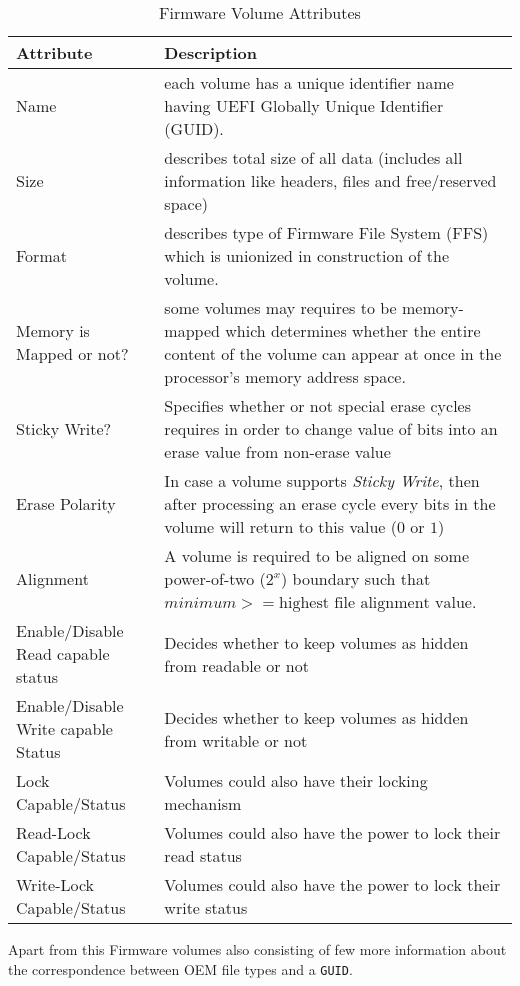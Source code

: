 \begin{table}[!htbp]
	\centering
	\renewcommand{\arraystretch}{2}
	\caption{Firmware Volume Attributes}\label{table:firmware-volume-attributes}
	\begin{tabular}{p{4cm} | p{11cm}}
		\textbf{Attribute} & \textbf{Description}
		\\ \hline \hline
		Name & each volume has a unique identifier name having UEFI Globally Unique Identifier (GUID). 
		\\ \hline
		Size & describes total size of all data (includes all information like headers, files and free/reserved space)
		\\ \hline
		Format & describes type of Firmware File System (FFS) which is unionized in construction of the volume.
		\\ \hline
		Memory is Mapped or not? & some volumes may requires to be memory-mapped which determines whether the entire content of the volume can appear at once in the processor's memory address space. 
		\\ \hline
		Sticky Write? & Specifies whether or not special erase cycles requires in order to change value of bits into an erase value from non-erase value
		\\ \hline
		Erase Polarity & In case a volume supports \textit{Sticky Write}, then after processing an erase cycle every bits in the volume will return to this value ($ 0 $ or $ 1 $)
		\\ \hline
		Alignment & A volume is required to be aligned on some power-of-two ($ 2^x $) boundary such that $ minimum >= \text{highest file alignment value} $.
		\\ \hline
		Enable/Disable Read capable status & Decides whether to keep volumes as hidden from readable or not
		\\ \hline
		Enable/Disable Write capable Status & Decides whether to keep volumes as hidden from writable or not
		\\ \hline
		Lock Capable/Status & Volumes could also have their locking mechanism
		\\ \hline
		Read-Lock Capable/Status & Volumes could also have the power to lock their read status
		\\ \hline
		Write-Lock Capable/Status & Volumes could also have the power to lock their write status
		\\ \hline
	\end{tabular}
\end{table}

Apart from this Firmware volumes also consisting of few more information about the correspondence between OEM file types and a \verb|GUID|.

